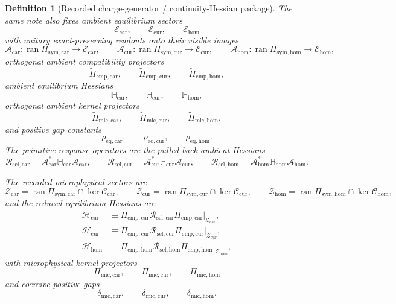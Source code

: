 \documentclass[11pt]{article}
\newcommand{\UltraTensorClass}{\mathscr Z_{\mathrm{car}}}
\newcommand{\UltraRelabelClass}{\mathscr Z_{\mathrm{cur}}}
\newcommand{\UltraFreeClass}{\mathscr Z_{\mathrm{hom}}}
\newcommand{\UltraCarProj}{\Pi_{\mathrm{mic,car}}}
\newcommand{\UltraCurProj}{\Pi_{\mathrm{mic,cur}}}
\newcommand{\UltraHomProj}{\Pi_{\mathrm{mic,hom}}}
\newcommand{\UltraCarGap}{\delta_{\mathrm{mic,car}}}
\newcommand{\UltraCurGap}{\delta_{\mathrm{mic,cur}}}
\newcommand{\UltraHomGap}{\delta_{\mathrm{mic,hom}}}
\newcommand{\TensorSymProj}{\Pi_{\mathrm{sym,car}}}
\newcommand{\CurSymProj}{\Pi_{\mathrm{sym,cur}}}
\newcommand{\HomSymProj}{\Pi_{\mathrm{sym,hom}}}
\newcommand{\TensorCompat}{\mathcal C_{\mathrm{car}}}
\newcommand{\CurCompat}{\mathcal C_{\mathrm{cur}}}
\newcommand{\HomCompat}{\mathcal C_{\mathrm{hom}}}
\newcommand{\TensorHess}{\mathcal H_{\mathrm{car}}}
\newcommand{\CurHess}{\mathcal H_{\mathrm{cur}}}
\newcommand{\HomHess}{\mathcal H_{\mathrm{hom}}}
\newcommand{\TensorCmpProj}{\Pi_{\mathrm{cmp,car}}}
\newcommand{\CurCmpProj}{\Pi_{\mathrm{cmp,cur}}}
\newcommand{\HomCmpProj}{\Pi_{\mathrm{cmp,hom}}}
\newcommand{\TensorResp}{\mathcal R_{\mathrm{sel,car}}}
\newcommand{\CurResp}{\mathcal R_{\mathrm{sel,cur}}}
\newcommand{\HomResp}{\mathcal R_{\mathrm{sel,hom}}}
\newcommand{\TensorEqClass}{\mathscr E_{\mathrm{car}}}
\newcommand{\CurEqClass}{\mathscr E_{\mathrm{cur}}}
\newcommand{\HomEqClass}{\mathscr E_{\mathrm{hom}}}
\newcommand{\TensorEqRead}{\mathcal A_{\mathrm{car}}}
\newcommand{\CurEqRead}{\mathcal A_{\mathrm{cur}}}
\newcommand{\HomEqRead}{\mathcal A_{\mathrm{hom}}}
\newcommand{\TensorAmbientHess}{\mathbb H_{\mathrm{car}}}
\newcommand{\CurAmbientHess}{\mathbb H_{\mathrm{cur}}}
\newcommand{\HomAmbientHess}{\mathbb H_{\mathrm{hom}}}
\newcommand{\TensorEqCmpProj}{\widetilde\Pi_{\mathrm{cmp,car}}}
\newcommand{\CurEqCmpProj}{\widetilde\Pi_{\mathrm{cmp,cur}}}
\newcommand{\HomEqCmpProj}{\widetilde\Pi_{\mathrm{cmp,hom}}}
\newcommand{\TensorEqKerProj}{\widetilde\Pi_{\mathrm{mic,car}}}
\newcommand{\CurEqKerProj}{\widetilde\Pi_{\mathrm{mic,cur}}}
\newcommand{\HomEqKerProj}{\widetilde\Pi_{\mathrm{mic,hom}}}
\newcommand{\EqCarGap}{\rho_{\mathrm{eq,car}}}
\newcommand{\EqCurGap}{\rho_{\mathrm{eq,cur}}}
\newcommand{\EqHomGap}{\rho_{\mathrm{eq,hom}}}
\newtheorem{definition}{Definition}
\begin{document}
\begin{definition}[Recorded charge-generator / continuity-Hessian package]
The same note also fixes ambient equilibrium sectors
\[
\TensorEqClass,\qquad
\CurEqClass,\qquad
\HomEqClass
\]
with unitary exact-preserving readouts onto their visible images
\[
\TensorEqRead:\operatorname{ran}\TensorSymProj\to\TensorEqClass,\qquad
\CurEqRead:\operatorname{ran}\CurSymProj\to\CurEqClass,\qquad
\HomEqRead:\operatorname{ran}\HomSymProj\to\HomEqClass,
\]
orthogonal ambient compatibility projectors
\[
\TensorEqCmpProj,\qquad
\CurEqCmpProj,\qquad
\HomEqCmpProj,
\]
ambient equilibrium Hessians
\[
\TensorAmbientHess,\qquad
\CurAmbientHess,\qquad
\HomAmbientHess,
\]
orthogonal ambient kernel projectors
\[
\TensorEqKerProj,\qquad
\CurEqKerProj,\qquad
\HomEqKerProj,
\]
and positive gap constants
\[
\EqCarGap,\qquad
\EqCurGap,\qquad
\EqHomGap.
\]
The primitive response operators are the pulled-back ambient Hessians
\begin{equation}
\TensorResp=\TensorEqRead^*\TensorAmbientHess\TensorEqRead,\qquad
\CurResp=\CurEqRead^*\CurAmbientHess\CurEqRead,\qquad
\HomResp=\HomEqRead^*\HomAmbientHess\HomEqRead.
\label{eq:recorded_response_from_ambient}
\end{equation}

The recorded microphysical sectors are
\begin{equation}
\UltraTensorClass=\operatorname{ran}\TensorSymProj\cap\ker\TensorCompat,
\qquad
\UltraRelabelClass=\operatorname{ran}\CurSymProj\cap\ker\CurCompat,
\qquad
\UltraFreeClass=\operatorname{ran}\HomSymProj\cap\ker\HomCompat,
\label{eq:recorded_ultra}
\end{equation}
and the reduced equilibrium Hessians are
\begin{equation}
\begin{aligned}
\TensorHess
&\equiv
\TensorCmpProj\TensorResp\TensorCmpProj\big|_{\UltraTensorClass},
\\
\CurHess
&\equiv
\CurCmpProj\CurResp\CurCmpProj\big|_{\UltraRelabelClass},
\\
\HomHess
&\equiv
\HomCmpProj\HomResp\HomCmpProj\big|_{\UltraFreeClass},
\end{aligned}
\label{eq:recorded_hessians}
\end{equation}
with microphysical kernel projectors
\[
\UltraCarProj,\qquad
\UltraCurProj,\qquad
\UltraHomProj
\]
and coercive positive gaps
\[
\UltraCarGap,\qquad
\UltraCurGap,\qquad
\UltraHomGap.
\]
\end{definition}
\end{document}
